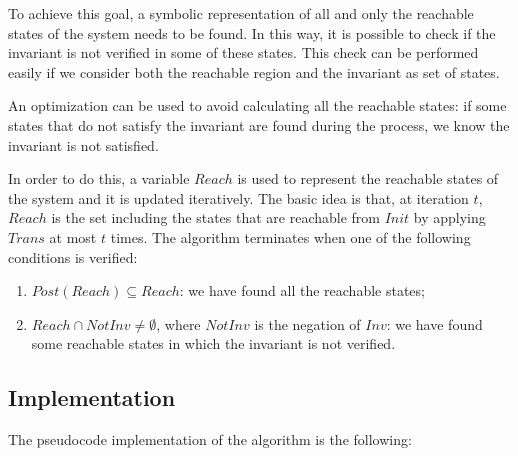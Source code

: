 \documentclass[12pt]{article}
\begin{document}
    To achieve this goal, a symbolic representation of all and only the reachable states of the system needs to be found.
    In this way, it is possible to check if the invariant is not verified in some of these states.
    This check can be performed easily if we consider both the reachable region and the invariant as set of states.

    An optimization can be used to avoid calculating all the reachable states: if some states that do not satisfy the invariant are found during the process, we know the invariant is not satisfied.

    In order to do this, a variable $Reach$ is used to represent the reachable states of the system and it is updated iteratively.
    The basic idea is that, at iteration $t$, $Reach$ is the set including the states that are reachable from $Init$ by applying $Trans$ at most $t$ times.
    The algorithm terminates when one of the following conditions is verified:
    \begin{enumerate}
        \item $Post(Reach) \subseteq Reach $: we have found all the reachable states;
        \item $Reach \cap NotInv \neq \emptyset$, where $NotInv$ is the negation of $Inv$: we have found some reachable states in which the invariant is not verified.
    \end{enumerate}

    \subsection{Implementation}
    The pseudocode implementation of the algorithm is the following:
\end{document}
